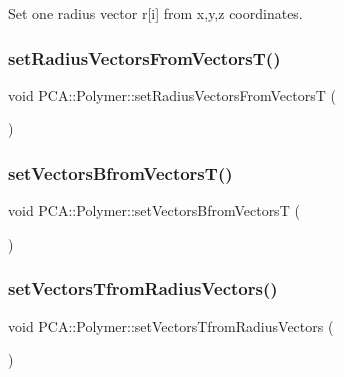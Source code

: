 Set one radius vector r\mbox{[}i\mbox{]} from x,y,z coordinates. 

\hypertarget{class_p_c_a_1_1_polymer_a258f607c38c1a247dd37659b236aa3fa}{}\label{class_p_c_a_1_1_polymer_a258f607c38c1a247dd37659b236aa3fa} 
\subsubsection{\texorpdfstring{set\+Radius\+Vectors\+From\+Vectors\+T()}{setRadiusVectorsFromVectorsT()}}
{\footnotesize\ttfamily void P\+C\+A\+::\+Polymer\+::set\+Radius\+Vectors\+From\+VectorsT (\begin{DoxyParamCaption}{ }\end{DoxyParamCaption})}

\hypertarget{class_p_c_a_1_1_polymer_a8dad939cbc8d8df73784526ad4a07aef}{}\label{class_p_c_a_1_1_polymer_a8dad939cbc8d8df73784526ad4a07aef} 
\subsubsection{\texorpdfstring{set\+Vectors\+Bfrom\+Vectors\+T()}{setVectorsBfromVectorsT()}}
{\footnotesize\ttfamily void P\+C\+A\+::\+Polymer\+::set\+Vectors\+Bfrom\+VectorsT (\begin{DoxyParamCaption}{ }\end{DoxyParamCaption})}

\hypertarget{class_p_c_a_1_1_polymer_aa655eb1299b272fef8c91f003abbf50d}{}\label{class_p_c_a_1_1_polymer_aa655eb1299b272fef8c91f003abbf50d} 
\subsubsection{\texorpdfstring{set\+Vectors\+Tfrom\+Radius\+Vectors()}{setVectorsTfromRadiusVectors()}}
{\footnotesize\ttfamily void P\+C\+A\+::\+Polymer\+::set\+Vectors\+Tfrom\+Radius\+Vectors (\begin{DoxyParamCaption}{ }\end{DoxyParamCaption})}

